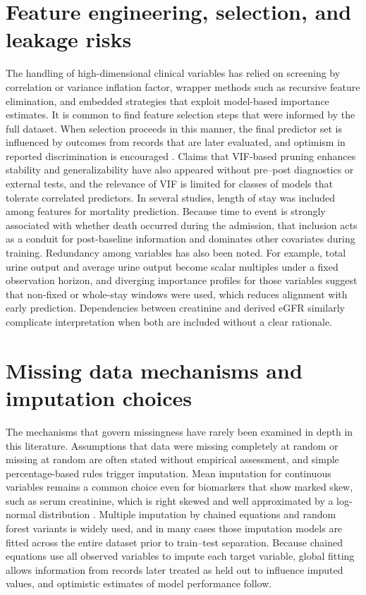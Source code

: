 \section{Feature engineering, selection, and leakage risks}
The handling of high-dimensional clinical variables has relied on screening by correlation or variance inflation factor, wrapper methods such as recursive feature elimination, and embedded strategies that exploit model-based importance estimates. It is common to find feature selection steps that were informed by the full dataset. When selection proceeds in this manner, the final predictor set is influenced by outcomes from records that are later evaluated, and optimism in reported discrimination is encouraged \citep{Kang_Yoon_2023}. Claims that VIF-based pruning enhances stability and generalizability have also appeared without pre--post diagnostics or external tests, and the relevance of VIF is limited for classes of models that tolerate correlated predictors. In several studies, length of stay was included among features for mortality prediction. Because time to event is strongly associated with whether death occurred during the admission, that inclusion acts as a conduit for post-baseline information and dominates other covariates during training. Redundancy among variables has also been noted. For example, total urine output and average urine output become scalar multiples under a fixed observation horizon, and diverging importance profiles for those variables suggest that non-fixed or whole-stay windows were used, which reduces alignment with early prediction. Dependencies between creatinine and derived eGFR similarly complicate interpretation when both are included without a clear rationale.

\section{Missing data mechanisms and imputation choices}
The mechanisms that govern missingness have rarely been examined in depth in this literature. Assumptions that data were missing completely at random or missing at random are often stated without empirical assessment, and simple percentage-based rules trigger imputation. Mean imputation for continuous variables remains a common choice even for biomarkers that show marked skew, such as serum creatinine, which is right skewed and well approximated by a log-normal distribution \citep{Haeckel_2010}. Multiple imputation by chained equations and random forest variants is widely used, and in many cases those imputation models are fitted across the entire dataset prior to train--test separation. Because chained equations use all observed variables to impute each target variable, global fitting allows information from records later treated as held out to influence imputed values, and optimistic estimates of model performance follow.

